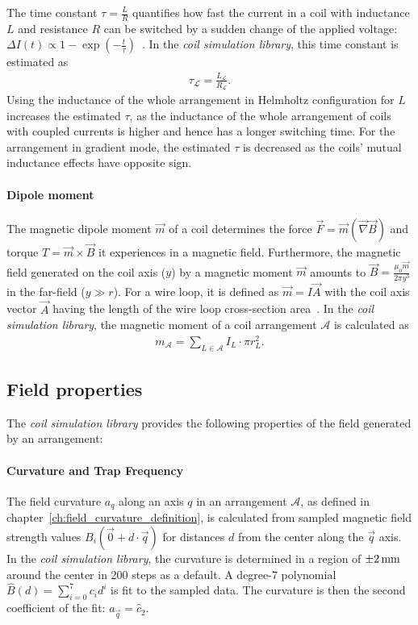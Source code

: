 The time constant $\tau = \frac{L}{R}$ quantifies how fast the current in a coil with inductance $L$ and resistance $R$ can be switched by a sudden change of the applied voltage: $\Delta I(t) \propto 1-\exp \left(-\frac{t}{\tau}\right)$~\cite{demtroder_zeitlich_2013}. In the \textit{coil simulation library}, this time constant is estimated as
\begin{align}\label{eq:time_constant_simulation}
    \tau_\mathcal{L} = \frac{L_\mathcal{L}}{R_\mathcal{L}}.
\end{align}
Using the inductance of the whole arrangement in Helmholtz configuration for $L$ increases  the estimated $\tau$, as the inductance of the whole arrangement of coils with coupled currents is higher and hence has a longer switching time. For the arrangement in gradient mode, the estimated $\tau$ is decreased as the coils' mutual inductance effects have opposite sign.

\paragraph{Dipole moment}
The magnetic dipole moment $\vec m$ of a coil determines the force $\vec F = \vec m (\vec \nabla \vec B)$ and torque $T = \vec m \times \vec B$ it experiences in a magnetic field. Furthermore, the magnetic field generated on the coil axis ($y$) by a magnetic moment $\vec m$ amounts to $\vec B = \frac{\mu_0 \vec m}{2\pi y^3}$ in the far-field ($y \gg r$). For a wire loop, it is defined as $\vec m = I \vec A$ with the coil axis vector $\vec A$ having the length of the wire loop cross-section area~\cite{demtroder_statische_2013}. In the \textit{coil simulation library}, the magnetic moment of a coil arrangement $\mathcal{A}$ is calculated as
\begin{align}\label{eq:dipole_moment_simulation}
    m_\mathcal{A} = \sum\limits_{L \in \mathcal{A}} I_L \cdot \pi r_L^2.
\end{align}

\subsection*{Field properties}
The \textit{coil simulation library} provides the following properties of the field generated by an arrangement:

\paragraph{Curvature and Trap Frequency}
The field curvature $a_q$ along an axis $q$ in an arrangement $\mathcal{A}$, as defined in chapter~\ref{ch:field_curvature_definition}, is calculated from sampled magnetic field strength values $B_i(\vec 0 + d \cdot \vec q)$ for distances $d$ from the center along the $\vec q$ axis. In the \textit{coil simulation library}, the curvature is determined in a region of $\SI{+-2}{\milli\meter}$ around the center in \SI{200}{} steps as a default. A degree-7 polynomial $\hat B(d) = \sum\limits_{i=0}^7 c_i d^i$ is fit to the sampled data. The curvature is then the second coefficient of the fit: $a_{\vec q} = \hat c_2$.

